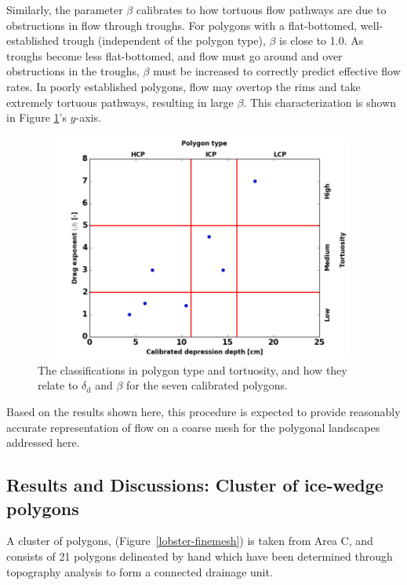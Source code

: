 Similarly, the parameter $\beta$ calibrates to how tortuous flow pathways are due to obstructions in flow through troughs.
For polygons with a flat-bottomed, well-established trough (independent of the polygon type), $\beta$ is close to 1.0.
As troughs become less flat-bottomed, and flow must go around and over obstructions in the troughs, $\beta$ must be increased to correctly predict effective flow rates.
In poorly established polygons, flow may overtop the rims and take extremely tortuous pathways, resulting in large $\beta$.
This characterization is shown in Figure \ref{beta-classification}'s $y$-axis.
%
\begin{figure}[!h]
\centering
\includegraphics[width=11cm,height=7.5cm]
{./figures/new-model/beta-classification-3.png}
\caption{The classifications in polygon type and tortuosity, and how they relate to $\delta_{\text{d}}$ and $\beta$ for the seven calibrated polygons.}
\label{beta-classification}
\end{figure}

Based on the results shown here, this procedure is expected to provide reasonably accurate representation of flow on a coarse mesh for the polygonal landscapes addressed here. 




%
\FloatBarrier
\subsection{Results and Discussions: Cluster of ice-wedge polygons}\label{numerical-tests-cluster}
A cluster of polygons, (Figure~\ref{lobster-finemesh}) is taken from Area C, and consists of 21 polygons delineated by hand which have been determined through topography analysis to form a connected drainage unit.

